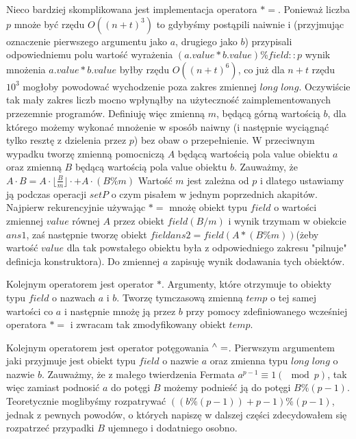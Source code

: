 \documentclass{article}
\begin{document}
Nieco bardziej skomplikowana jest implementacja operatora $*=$. Ponieważ liczba 
$p$ mnoże być rzędu $O((n+t)^3)$ to gdybyśmy postąpili naiwnie i (przyjmując 
oznaczenie pierwszego argumentu jako $a$, drugiego jako $b$) przypisali odpowiedniemu
polu wartość wyrażenia $(a.value*b.value)\%field::p$ wynik mnożenia $a.value*b.value$
byłby rzędu $O((n+t)^6)$, co już dla $n+t$ rzędu $10^3$ mogłoby powodować wychodzenie poza zakres 
zmiennej $long$ $long$. Oczywiście tak mały zakres liczb mocno wpłynąłby na użyteczność
zaimplementowanych przezemnie programów. Definiuję więc zmienną $m$, będącą 
górną wartością $b$, dla którego możemy wykonać mnożenie w sposób naiwny (i następnie 
wyciągnąć tylko resztę z dzielenia przez $p$) bez obaw o przepełnienie. W 
przeciwnym wypadku tworzę zmienną pomocniczą $A$ będącą wartością pola value
obiektu $a$ oraz zmienną $B$ będącą wartością pola value obiektu $b$.
Zauważmy, że $A \cdot B = A \cdot \lfloor \frac{B}{m} \rfloor \cdot  + A \cdot (B \% m)$
Wartość $m$ jest zależna od $p$ i dlatego ustawiamy ją podczas operacji $setP$ o czym pisałem w 
jednym poprzednich akapitów. Najpierw rekurencyjnie używając $*=$ mnożę
obiekt typu $field$ o wartości zmiennej $value$ równej $A$ przez obiekt $field(B/m)$ i wynik 
trzymam w obiekcie $ans1$, zaś następnie tworzę obiekt $field ans2 = field(A*(B\%m))$(żeby 
wartość $value$ dla tak powstałego obiektu była z odpowiedniego zakresu "pilnuje" definicja konstruktora).
Do zmiennej $a$ zapisuję wynik dodawania tych obiektów.

Kolejnym operatorem jest operator $*$. Argumenty, które otrzymuje
to obiekty typu $field$ o nazwach $a$ i $b$. Tworzę tymczasową zmienną $temp$
o tej samej wartości co $a$ i następnie mnożę ją przez $b$ przy pomocy
zdefiniowanego wcześniej operatora $*=$ i zwracam tak zmodyfikowany obiekt $temp$.

Kolejnym operatorem jest operator potęgowania $\textsuperscript{$\wedge$}=$. Pierwszym argumentem jaki przyjmuje 
jest obiekt typu $field$ o nazwie $a$ oraz zmienna typu $long$ $long$ o
nazwie $b$. Zauważmy, że z małego twierdzenia Fermata $a^{p-1} \equiv 1 (\mod p) $, tak więc
zamiast podnosić $a$ do potęgi $B$ możemy podnieść ją do potęgi $B\%(p-1)$.
Teoretycznie moglibyśmy rozpatrywać $((b\%(p-1))+p-1) \% (p - 1)$, jednak z pewnych powodów, o 
których napiszę w dalszej części zdecydowałem się rozpatrzeć przypadki $B$ ujemnego i 
dodatniego osobno. 
\end{document}
